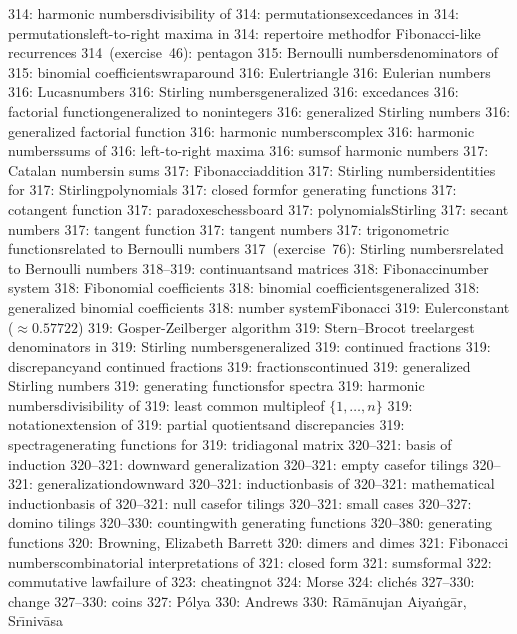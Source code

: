 314: harmonic numbers\sub divisibility of
314: permutations\sub excedances in
314: permutations\sub left-to-right maxima in
314: repertoire method\sub for Fibonacci-like recurrences
314~(exercise~46): pentagon
315: Bernoulli numbers\sub denominators of
315: binomial coefficients\sub wraparound
316: Euler\sub triangle
316: Eulerian numbers
316: Lucas\sub numbers
316: Stirling numbers\sub generalized
316: excedances
316: factorial function\sub generalized to nonintegers
316: generalized Stirling numbers
316: generalized factorial function
316: harmonic numbers\sub complex
316: harmonic numbers\sub sums of
316: left-to-right maxima
316: sums\sub of harmonic numbers
317: Catalan numbers\sub in sums
317: Fibonacci\sub addition
317: Stirling numbers\sub identities for
317: Stirling\sub polynomials
317: closed form\sub for generating functions
317: cotangent function
317: paradoxes\sub chessboard
317: polynomials\sub Stirling
317: secant numbers
317: tangent function
317: tangent numbers
317: trigonometric functions\sub related to Bernoulli numbers
317~(exercise~76): Stirling numbers\sub related to Bernoulli numbers
318--319: continuants\sub and matrices
318: Fibonacci\sub number system
318: Fibonomial coefficients
318: binomial coefficients\sub generalized
318: generalized binomial coefficients
318: number system\sub Fibonacci
319: Euler\sub constant ($\approx0.57722$)
319: Gosper-Zeilberger algorithm
319: Stern--Brocot tree\sub largest denominators in
319: Stirling numbers\sub generalized
319: continued fractions
319: discrepancy\sub and continued fractions
319: fractions\sub continued
319: generalized Stirling numbers
319: generating functions\sub for spectra
319: harmonic numbers\sub divisibility of
319: least common multiple\sub of $\{1,\ldots,n\}$
319: notation\sub extension of
319: partial quotients\sub and discrepancies
319: spectra\sub generating functions for
319: tridiagonal matrix
320--321: basis of induction
320--321: downward generalization
320--321: empty case\sub for tilings
320--321: generalization\sub downward
320--321: induction\sub basis of
320--321: mathematical induction\sub basis of
320--321: null case\sub for tilings
320--321: small cases
320--327: domino tilings
320--330: counting\sub with generating functions
320--380: generating functions
320: Browning, Elizabeth Barrett
320: dimers and dimes
321: Fibonacci numbers\sub combinatorial interpretations of
321: closed form
321: sums\sub formal
322: commutative law\sub failure of
323: cheating\sub not
324: Morse
324: clich\'es
327--330: change
327--330: coins
327: P\'olya
330: Andrews
330: R\=am\=anujan Aiya\.ng\=ar, Sr\=\i niv\=asa
